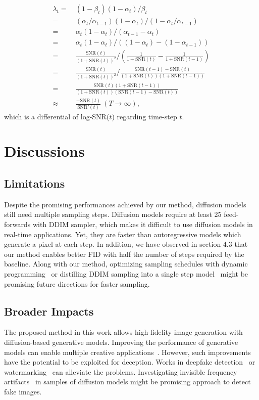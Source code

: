 \begin{align}\label{eq:derivation}
\lambda _t=~&
(1-\beta _t)(1-\alpha _t)/\beta _t\nonumber \\
=~&(\alpha _t / \alpha_{t-1})(1-\alpha _t)/(1-\alpha _t/\alpha _{t-1})\nonumber \\
=~&\alpha _t(1-\alpha _t)/(\alpha _{t-1}-\alpha _t)\nonumber \\
=~&\alpha _t(1-\alpha _t)/((1-\alpha _t)-(1 - \alpha _{t-1}))\nonumber \\
=~&\frac{\text{SNR}(t)}{(1+\text{SNR}(t))^2}/(\frac{1}{1+\text{SNR}(t)}-\frac{1}{1+\text{SNR}(t-1)})\nonumber \\
=~&\frac{\text{SNR}(t)}{(1+\text{SNR}(t))^2}/\frac{\text{SNR}(t-1)-\text{SNR}(t)}{(1+\text{SNR}(t))(1+\text{SNR}(t-1))}\nonumber \\
=~&\frac{\text{SNR}(t)(1+\text{SNR}(t-1))}{(1+\text{SNR}(t))(\text{SNR}(t-1)-\text{SNR}(t))}\nonumber \\
\approx~&\frac{-\text{SNR}(t)}{\text{SNR}'(t)}~(T\to \infty),
\end{align}
which is a differential of log-SNR($t$) regarding time-step $t$.

\section{Discussions}
\subsection{Limitations}
Despite the promising performances achieved by our method, diffusion models still need multiple sampling steps. Diffusion models require at least 25 feed-forwards with DDIM sampler, which makes it difficult to use diffusion models in real-time applications. Yet, they are faster than autoregressive models which generate a pixel at each step. In addition, we have observed in section 4.3 that our method enables better FID with half the number of steps required by the baseline. Along with our method, optimizing sampling schedules with dynamic programming~\cite{watson2021learning} or distilling DDIM sampling into a single step model~\cite{luhman2021knowledge} might be promising future directions for faster sampling.

\subsection{Broader Impacts}
The proposed method in this work allows high-fidelity image generation with diffusion-based generative models. Improving the performance of generative models can enable multiple creative applications~\cite{choi2021ilvr,meng2021sdedit}. However, such improvements have the potential to be exploited for deception. Works in deepfake detection~\cite{wang2020cnn} or watermarking~\cite{yu2021artificial} can alleviate the problems. Investigating invisible frequency artifacts~\cite{wang2020cnn} in samples of diffusion models might be promising approach to detect fake images.


